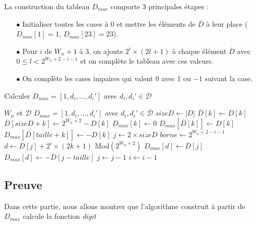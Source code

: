 \documentclass[12pt, a4paper]{memoir}
\begin{document}
\begin{Construction}
La construction du tableau \emph{$D_{max}$} comporte $3$ principales étapes :
\begin{itemize}
 \item[$\bullet$] Initialiser toutes les cases à $0$ et mettre les éléments de $\overline{D}$ à leur place ($D_{max}[1] = 1$, $D_{max}[23] = 23$).
 \item[$\bullet$] Pour $i$ de $W_n+1$ à $3$, on ajoute $2^i \times (2l+1)$ à chaque élément $\overline{D}$ avec $0 \leq l < 2^{W_n+2-i-1}$ et on complète le tableau avec ces valeurs. 
 \item[$\bullet$] On complète les cases impaires qui valent $0$ avec $1$ ou $-1$ suivant la case.
\end{itemize}

 \begin{algorithm}
  \caption{Calculer $D_{max} = [1,d_i,\ldots,d_i']$ avec $d_i,d_i' \in \overline{\mathcal{D}}$}
  \begin{algorithmic}
   \REQUIRE $W_n$ et $\mathcal{D}$
   \ENSURE $D_{max} = [1,d_i,\ldots,d_i']$ avec $d_i,d_i' \in \overline{\mathcal{D}}$
   \STATE $sizeD \leftarrow |D|$
   \STATE $\overline{D}[k] \leftarrow D[k]$
   \STATE $\overline{D}[sizeD+k] \leftarrow 2^{W_n+2}-D[k]$
   \ENDFOR
   \STATE $D_{max}[k] \leftarrow 0$
   \ENDFOR
   \STATE $D_{max}[\overline{D}[k]] \leftarrow D[k]$
   \STATE $D_{max}[\overline{D}[taille+k]] \leftarrow -D[k]$
   \ENDFOR
   \STATE $j \leftarrow 2 \times sizeD$
   \STATE $borne \leftarrow 2^{W_n+2-i-1}$
   \STATE $d \leftarrow \overline{D}[j] + 2^{i} \times (2k+1)$ Mod$(2^{W_n+2})$
   \STATE $D_{max}[d] \leftarrow \overline{D}[j]$
   \STATE $D_{max}[d] \leftarrow -\overline{D}[j-taille]$
   \ENDIF
   \ENDIF
   \ENDFOR
   \STATE $j \leftarrow j-1$
   \ENDWHILE   
   \STATE $i \leftarrow i-1$
   \ENDWHILE
  \end{algorithmic}
 \end{algorithm}
\end{Construction}

\subsection{Preuve}

Dans cette partie, nous allons montrer que l'algorithme construit à partir de \emph{$D_{max}$} calcule la fonction \emph{digit}
\end{document}
